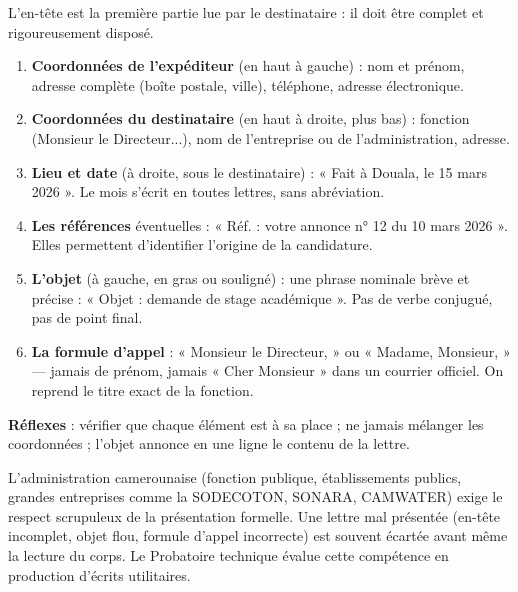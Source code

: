 \documentclass[11pt]{article}
\newcommand{\cle}[1]{{\popxbold\color{popdark}#1}}
\begin{document}
\begin{methode}
L'en-tête est la première partie lue par le destinataire : il doit être complet et rigoureusement disposé.
\begin{enumerate}
\item \textbf{Coordonnées de l'expéditeur} (en haut à gauche) : nom et prénom, adresse complète (boîte postale, ville), téléphone, adresse électronique.
\item \textbf{Coordonnées du destinataire} (en haut à droite, plus bas) : fonction (Monsieur le Directeur...), nom de l'entreprise ou de l'administration, adresse.
\item \textbf{Lieu et date} (à droite, sous le destinataire) : « Fait à Douala, le 15 mars 2026 ». Le mois s'écrit en toutes lettres, sans abréviation.
\item \textbf{Les références} éventuelles : « Réf. : votre annonce n° 12 du 10 mars 2026 ». Elles permettent d'identifier l'origine de la candidature.
\item \textbf{L'objet} (à gauche, en gras ou souligné) : une phrase nominale brève et précise : « Objet : demande de stage académique ». Pas de verbe conjugué, pas de point final.
\item \textbf{La formule d'appel} : « Monsieur le Directeur, » ou « Madame, Monsieur, » — jamais de prénom, jamais « Cher Monsieur » dans un courrier officiel. On reprend le titre exact de la fonction.
\end{enumerate}
\textbf{Réflexes} : vérifier que chaque élément est à sa place ; ne jamais mélanger les coordonnées ; l'objet annonce en une ligne le contenu de la lettre.
\end{methode}

\begin{savaistu}
L'administration camerounaise (fonction publique, établissements publics, grandes entreprises comme la SODECOTON, SONARA, CAMWATER) exige le respect scrupuleux de la présentation formelle. Une lettre mal présentée (en-tête incomplet, objet flou, formule d'appel incorrecte) est souvent écartée avant même la lecture du corps. Le \cle{Probatoire technique} évalue cette compétence en production d'écrits utilitaires.
\end{savaistu}
\end{document}
